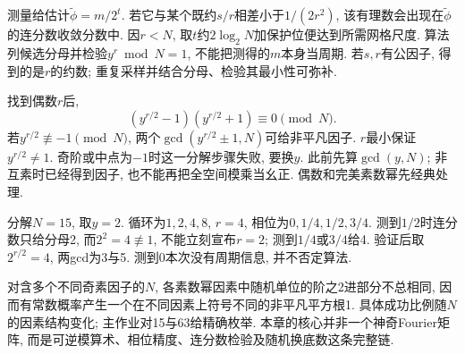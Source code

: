 测量给估计$\widetilde\phi=m/2^t$. 若它与某个既约$s/r$相差小于$1/(2r^2)$, 该有理数会出现在$\widetilde\phi$的连分数收敛分数中. 因$r<N$, 取$t$约$2\log_2N$加保护位便达到所需网格尺度. 算法列候选分母并检验$y^r\bmod N=1$, 不能把测得的$m$本身当周期. 若$s,r$有公因子, 得到的是$r$的约数; 重复采样并结合分母、检验其最小性可弥补.

找到偶数$r$后,
\[(y^{r/2}-1)(y^{r/2}+1)\equiv0\pmod N.\]
若$y^{r/2}\not\equiv-1\pmod N$, 两个$\gcd(y^{r/2}\pm1,N)$可给非平凡因子. $r$最小保证$y^{r/2}\ne1$. 奇阶或中点为$-1$时这一分解步骤失败, 要换$y$. 此前先算$\gcd(y,N)$; 非互素时已经得到因子, 也不能再把全空间模乘当幺正. 偶数和完美素数幂先经典处理.

\begin{example}分解$N=15$, 取$y=2$. 循环为$1,2,4,8$, $r=4$, 相位为$0,1/4,1/2,3/4$. 测到$1/2$时连分数只给分母2, 而$2^2=4\not\equiv1$, 不能立刻宣布$r=2$; 测到$1/4$或$3/4$给4. 验证后取$2^{r/2}=4$, 两gcd为3与5. 测到0本次没有周期信息, 并不否定算法.\end{example}

对含多个不同奇素因子的$N$, 各素数幂因素中随机单位的阶之2进部分不总相同, 因而有常数概率产生一个在不同因素上符号不同的非平凡平方根1. 具体成功比例随$N$的因素结构变化; 主作业对15与63给精确枚举. 本章的核心并非一个神奇Fourier矩阵, 而是可逆模算术、相位精度、连分数检验及随机换底数这条完整链.
